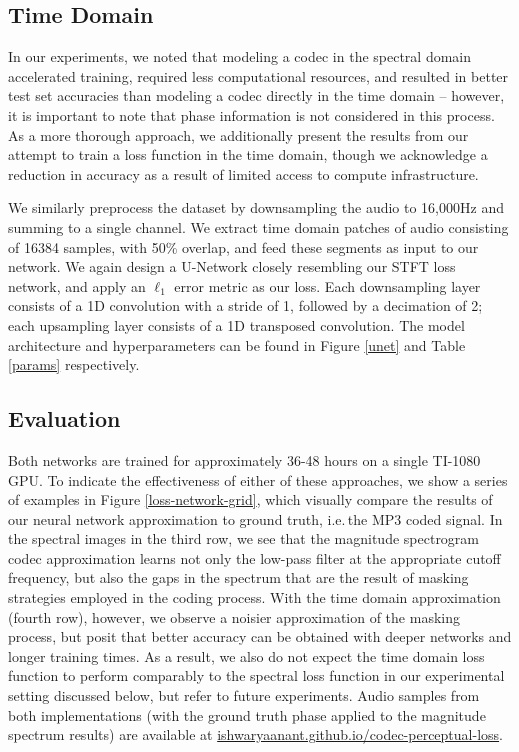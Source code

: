 \documentclass[sigconf]{acmart}
\begin{document}
\subsection{Time Domain}
In our experiments, we noted that modeling a codec in the spectral domain accelerated training, required less computational resources, and resulted in better test set accuracies than modeling a codec directly in the time domain -- however, it is important to note that phase information is not considered in this process.  As a more thorough approach, we additionally present the results from our attempt to train a loss function in the time domain, though we acknowledge a reduction in accuracy as a result of limited access to compute infrastructure.

We similarly preprocess the dataset by downsampling the audio to 16,000Hz and summing to a single channel.  We extract time domain patches of audio consisting of 16384 samples, with 50\% overlap, and feed these segments as input to our network.  We again design a U-Network closely resembling our STFT loss network, and apply an $\ell_{1}$ error metric as our loss.  Each downsampling layer consists of a 1D convolution with a stride of 1, followed by a decimation of 2; each upsampling layer consists of a 1D transposed convolution. The model architecture and hyperparameters can be found in Figure \ref{unet} and Table \ref{params} respectively.

\subsection{Evaluation}
Both networks are trained for approximately 36-48 hours on a single TI-1080 GPU. To indicate the effectiveness of either of these approaches, we show a series of examples in Figure \ref{loss-network-grid}, which visually compare the results of our neural network approximation to ground truth, i.e.\,the MP3 coded signal. In the spectral images in the third row, we see that the magnitude spectrogram codec approximation learns not only the low-pass filter at the appropriate cutoff frequency, but also the gaps in the spectrum that are the result of masking strategies employed in the coding process.  With the time domain approximation (fourth row), however, we observe a noisier approximation of the masking process, but posit that better accuracy can be obtained with deeper networks and longer training times.  As a result, we also do not expect the time domain loss function to perform comparably to the spectral loss function in our experimental setting discussed below, but refer to future experiments. Audio samples from both implementations (with the ground truth phase applied to the magnitude spectrum results) are available at \url{ishwaryaanant.github.io/codec-perceptual-loss}. 
\end{document}
